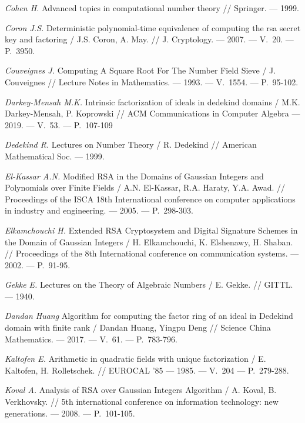 \begin{thebibliography}{99}
    \textit{Cohen H.} Advanced topics in computational number theory // Springer. --- 1999.
    
    \textit{Coron J.S.} Deterministic polynomial-time equivalence of computing the rsa secret key and factoring / J.S. Coron, A. May. // J. Cryptology. --- 2007. --- V.~20. --- P.~3950.

    \textit{Couveignes J.} Computing A Square Root For The Number Field Sieve / J. Couveignes // Lecture Notes in Mathematics. --- 1993. --- V.~1554. --- P.~95-102.

    \textit{Darkey-Mensah M.K.} Intrinsic factorization of ideals in dedekind domains / M.K. Darkey-Mensah, P. Koprowski // ACM Communications in Computer Algebra --- 2019. --- V.~53. --- P.~107-109

    \textit{Dedekind R.} Lectures on Number Theory / R. Dedekind // American Mathematical Soc. --- 1999.

    \textit{El-Kassar A.N.} Modified RSA in the Domains of Gaussian Integers and Polynomials over Finite Fields / A.N. El-Kassar, R.A. Haraty, Y.A. Awad. // Proceedings of the ISCA 18th International conference on computer applications in industry and engineering. --- 2005. --- P.~298-303.

    \textit{Elkamchouchi H.} Extended RSA Cryptosystem and Digital Signature Schemes in the Domain of Gaussian Integers / H. Elkamchouchi, K. Elshenawy, H. Shaban. // Proceedings of the 8th International conference on communication systems. --- 2002. --- P.~91-95.

    \textit{Gekke E.} Lectures on the Theory of Algebraic Numbers / E. Gekke. // GITTL. --- 1940.

    \textit{Dandan Huang} Algorithm for computing the factor ring of an ideal in Dedekind domain with finite rank / Dandan Huang, Yingpu Deng // Science China Mathematics. --- 2017. --- V.~61. --- P.~783-796.

    \textit{Kaltofen E.} Arithmetic in quadratic fields with unique factorization / E. Kaltofen, H. Rolletschek. // EUROCAL '85 --- 1985. --- V.~204 --- P.~279-288.

    \textit{Koval A.} Analysis of RSA over Gaussian Integers Algorithm / A. Koval, B. Verkhovsky. // 5th international conference on information technology: new generations. --- 2008. --- {P.}~101-105.
    

\end{thebibliography}
